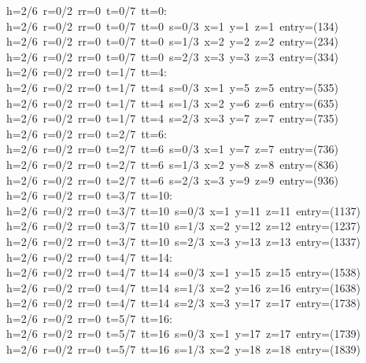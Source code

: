 \begin{tabbing}
h=2/6\ r=0/2\ rr=0\ t=0/7\ tt=0:\\[0pt]
h=2/6\ r=0/2\ rr=0\ t=0/7\ tt=0\ s=0/3\ x=1\ y=1\ z=1\ entry=(134)\\[0pt]
h=2/6\ r=0/2\ rr=0\ t=0/7\ tt=0\ s=1/3\ x=2\ y=2\ z=2\ entry=(234)\\[0pt]
h=2/6\ r=0/2\ rr=0\ t=0/7\ tt=0\ s=2/3\ x=3\ y=3\ z=3\ entry=(334)\\[0pt]
h=2/6\ r=0/2\ rr=0\ t=1/7\ tt=4:\\[0pt]
h=2/6\ r=0/2\ rr=0\ t=1/7\ tt=4\ s=0/3\ x=1\ y=5\ z=5\ entry=(535)\\[0pt]
h=2/6\ r=0/2\ rr=0\ t=1/7\ tt=4\ s=1/3\ x=2\ y=6\ z=6\ entry=(635)\\[0pt]
h=2/6\ r=0/2\ rr=0\ t=1/7\ tt=4\ s=2/3\ x=3\ y=7\ z=7\ entry=(735)\\[0pt]
h=2/6\ r=0/2\ rr=0\ t=2/7\ tt=6:\\[0pt]
h=2/6\ r=0/2\ rr=0\ t=2/7\ tt=6\ s=0/3\ x=1\ y=7\ z=7\ entry=(736)\\[0pt]
h=2/6\ r=0/2\ rr=0\ t=2/7\ tt=6\ s=1/3\ x=2\ y=8\ z=8\ entry=(836)\\[0pt]
h=2/6\ r=0/2\ rr=0\ t=2/7\ tt=6\ s=2/3\ x=3\ y=9\ z=9\ entry=(936)\\[0pt]
h=2/6\ r=0/2\ rr=0\ t=3/7\ tt=10:\\[0pt]
h=2/6\ r=0/2\ rr=0\ t=3/7\ tt=10\ s=0/3\ x=1\ y=11\ z=11\ entry=(1137)\\[0pt]
h=2/6\ r=0/2\ rr=0\ t=3/7\ tt=10\ s=1/3\ x=2\ y=12\ z=12\ entry=(1237)\\[0pt]
h=2/6\ r=0/2\ rr=0\ t=3/7\ tt=10\ s=2/3\ x=3\ y=13\ z=13\ entry=(1337)\\[0pt]
h=2/6\ r=0/2\ rr=0\ t=4/7\ tt=14:\\[0pt]
h=2/6\ r=0/2\ rr=0\ t=4/7\ tt=14\ s=0/3\ x=1\ y=15\ z=15\ entry=(1538)\\[0pt]
h=2/6\ r=0/2\ rr=0\ t=4/7\ tt=14\ s=1/3\ x=2\ y=16\ z=16\ entry=(1638)\\[0pt]
h=2/6\ r=0/2\ rr=0\ t=4/7\ tt=14\ s=2/3\ x=3\ y=17\ z=17\ entry=(1738)\\[0pt]
h=2/6\ r=0/2\ rr=0\ t=5/7\ tt=16:\\[0pt]
h=2/6\ r=0/2\ rr=0\ t=5/7\ tt=16\ s=0/3\ x=1\ y=17\ z=17\ entry=(1739)\\[0pt]
h=2/6\ r=0/2\ rr=0\ t=5/7\ tt=16\ s=1/3\ x=2\ y=18\ z=18\ entry=(1839)\\[0pt]

\end{tabbing}
